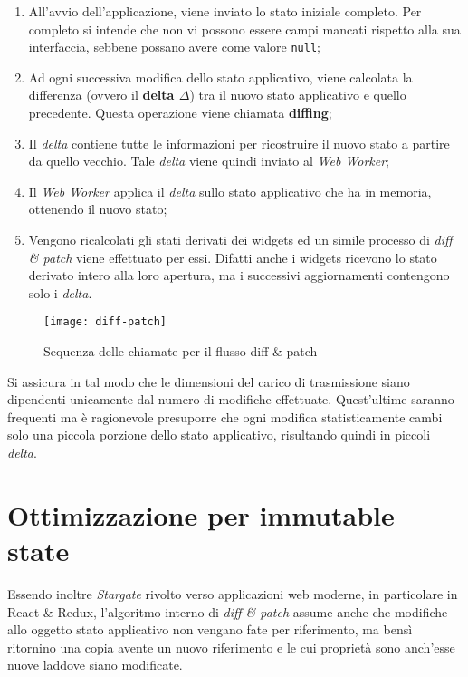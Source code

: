 \begin{enumerate}
  \item All'avvio dell'applicazione, viene inviato lo stato iniziale completo. Per completo si intende che non vi possono essere campi mancati rispetto alla sua interfaccia, sebbene possano avere come valore \texttt{null};
  \item Ad ogni successiva modifica dello stato applicativo, viene calcolata la differenza (ovvero il \textbf{delta $\Delta$}) tra il nuovo stato applicativo e quello precedente. Questa operazione viene chiamata \textbf{diffing};
  \item Il \textit{delta} contiene tutte le informazioni per ricostruire il nuovo stato a partire da quello vecchio. Tale \textit{delta} viene quindi inviato al \textit{Web Worker};
  \item Il \textit{Web Worker} applica il \textit{delta} sullo stato applicativo che ha in memoria, ottenendo il nuovo stato;
  \item Vengono ricalcolati gli stati derivati dei widgets ed un simile processo di \textit{diff \& patch} viene effettuato per essi. Difatti anche i widgets ricevono lo stato derivato intero alla loro apertura, ma i successivi aggiornamenti contengono solo i \textit{delta}.
\end{enumerate}

\begin{figure}[H] 
  \centering 
  \texttt{[image: diff-patch]} 
  \caption{Sequenza delle chiamate per il flusso diff \& patch}
\end{figure}

Si assicura in tal modo che le dimensioni del carico di trasmissione siano dipendenti unicamente dal numero di modifiche effettuate. Quest'ultime saranno frequenti ma è ragionevole presuporre che ogni modifica statisticamente cambi solo una piccola porzione dello stato applicativo, risultando quindi in piccoli \textit{delta}. \\

\section{Ottimizzazione per immutable state}

Essendo inoltre \textit{Stargate} rivolto verso applicazioni web moderne, in particolare in React \& Redux, l'algoritmo interno di \textit{diff \& patch} assume anche che modifiche allo oggetto stato applicativo non vengano fate per riferimento, ma bensì ritornino una copia avente un nuovo riferimento e le cui proprietà sono anch'esse nuove laddove siano modificate.

